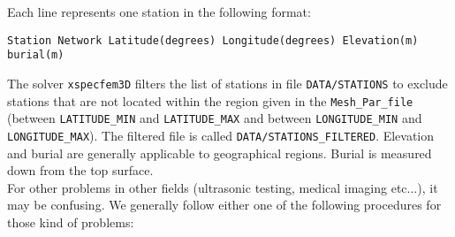\noindent
Each line represents one station in the following format:
{\small
\begin{verbatim}
Station Network Latitude(degrees) Longitude(degrees) Elevation(m) burial(m)
\end{verbatim}
}
The solver \texttt{xspecfem3D} filters the list of stations in file
\texttt{DATA/STATIONS} to exclude stations that are not located within
the region given in the \texttt{Mesh\_Par\_file} (between \texttt{LATITUDE\_MIN}
and \texttt{LATITUDE\_MAX} and between \texttt{LONGITUDE\_MIN} and
\texttt{LONGITUDE\_MAX}). The filtered file is called \texttt{DATA/STATIONS\_FILTERED}.
Elevation and burial are generally applicable to geographical regions.
Burial is measured down from the top surface.\\


\noindent
For other problems in other
fields (ultrasonic testing, medical imaging etc...),
it may be confusing. We generally follow either one of the following
procedures for those kind of problems:
